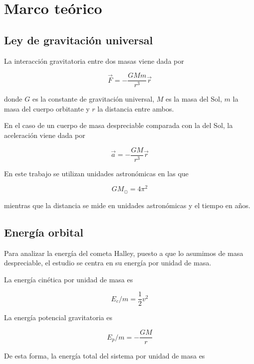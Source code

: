 \documentclass[11pt,a4paper]{article}
\begin{document}
\section{Marco teórico}

\subsection{Ley de gravitación universal}

La interacción gravitatoria entre dos masas viene dada por

\begin{equation}
\vec{F} = -\frac{GMm}{r^3}\vec{r}
\end{equation}

donde $G$ es la constante de gravitación universal, $M$ es la masa del Sol, $m$ la masa del cuerpo orbitante y $r$ la distancia entre ambos.

En el caso de un cuerpo de masa despreciable comparada con la del Sol, la aceleración viene dada por

\begin{equation}
\vec{a} = -\frac{GM}{r^3}\vec{r}
\end{equation}

En este trabajo se utilizan unidades astronómicas en las que

\begin{equation}
GM_{\odot} = 4\pi^2
\end{equation}

mientras que la distancia se mide en unidades astronómicas y el tiempo en años.

\subsection{Energía orbital}

Para analizar la energía del cometa Halley, puesto a que lo asumimos de masa despreciable, el estudio se centra en su energía por unidad de masa.

La energía cinética por unidad de masa es

\begin{equation}
E_c/m = \frac{1}{2}v^2
\end{equation}

La energía potencial gravitatoria es

\begin{equation}
E_p/m = -\frac{GM}{r}
\end{equation}

De esta forma, la energía total del sistema por unidad de masa es
\end{document}
